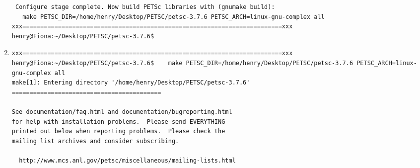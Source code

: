 \documentclass{article}
\begin{document}
\begin{enumerate}
\begin{verbatim}
 Configure stage complete. Now build PETSc libraries with (gnumake build):
   make PETSC_DIR=/home/henry/Desktop/PETSC/petsc-3.7.6 PETSC_ARCH=linux-gnu-complex all
xxx=========================================================================xxx
henry@Fiona:~/Desktop/PETSC/petsc-3.7.6$                                                                                                                                                                             
\end{verbatim}
\normalsize
\item  
\tiny
\begin{verbatim}
xxx=========================================================================xxx
henry@Fiona:~/Desktop/PETSC/petsc-3.7.6$    make PETSC_DIR=/home/henry/Desktop/PETSC/petsc-3.7.6 PETSC_ARCH=linux-gnu-complex all                                                                                   
make[1]: Entering directory '/home/henry/Desktop/PETSC/petsc-3.7.6'
==========================================
 
See documentation/faq.html and documentation/bugreporting.html
for help with installation problems.  Please send EVERYTHING
printed out below when reporting problems.  Please check the
mailing list archives and consider subscribing.
 
  http://www.mcs.anl.gov/petsc/miscellaneous/mailing-lists.html
 

\end{verbatim}
\end{enumerate}
\end{document}
